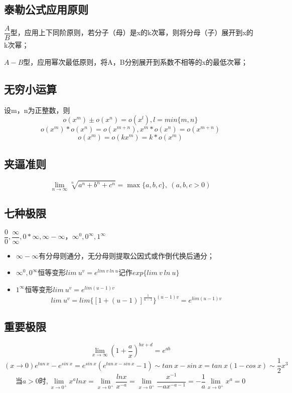 \subsection{泰勒公式应用原则}

\(\dfrac{A}{B}\)型，应用上下同阶原则，若分子（母）是x的k次幂，则将分母（子）展开到x的k次幂；

\(A - B\)型，应用幂次最低原则，将A，B分别展开到系数不相等的x的最低次幂；





\subsection{无穷小运算}
设m，n为正整数，则
\[o(x^m) \pm o(x^n) = o(x^l), l = min\{m, n\}\]
\[o(x^m) * o(x^n) = o(x^{m + n}), x^m * o(x^n) = o(x^{m + n})\]
\[o(x^m) = o(kx^m) = k*o(x^m)\]


\subsection{夹逼准则}

\[\lim_{n \to \infty}\sqrt[n]{a^n + b^n + c^n} = \max\{a, b, c\},\ (a, b, c > 0)\]

\subsection{七种极限}
\(\dfrac{0}{0}, \dfrac{\infty}{\infty}, 0 * \infty, \infty - \infty， \infty^0, 0^{\infty}, 1^{\infty}\)

\begin{itemize}
    \item \(\infty - \infty\)有分母则通分，无分母则提取公因式或作倒代换后通分；
    \item \(\infty^0, 0^{\infty}\)恒等变形\(lim\ u^v = e^{lim\ v\ ln\ u} \text{记作}exp\{lim\ v\ ln\ u\}\)
    \item \(1^{\infty}\)恒等变形\(lim\ u^v = e^{lim(u - 1)v}\)
    \[lim\ u^v = lim\{[1 + (u - 1)]^{\frac{1}{u - 1}}\}^{(u - 1)v} = e^{lim(u - 1)v}\]
\end{itemize}





\subsection{重要极限}
\[\lim_{x \to \infty}(1 + \dfrac{a}{x})^{bx + d} = e^{ab}\]
\begin{displaymath}
(x \to 0)
e^{tan\ x} - e^{sin\ x} = 
e^{sin\ x}(e^{tan\ x - sin\ x} - 1) \sim
tan\ x - sin\ x = tan\ x(1 - cos\ x) \sim \dfrac{1}{2}x^3
\end{displaymath}
\begin{displaymath}
当a > 0时,
\lim_{x \to 0^{+}} x^{a}lnx = 
\lim_{x \to 0^{+}} \frac{lnx}{x^{-a}} =
\lim_{x \to 0^{+}} \frac{x^{-1}}{-ax^{-a-1}} = 
-\frac{1}{a} \lim_{x \to 0^{+}} x^{a} = 0
\end{displaymath}

